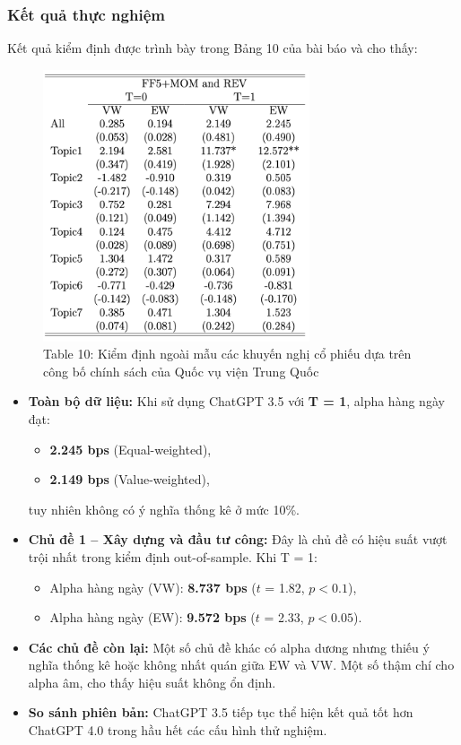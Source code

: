 \documentclass[a4paper,12pt]{article}
\begin{document}
\subsubsection{Kết quả thực nghiệm}

Kết quả kiểm định được trình bày trong Bảng 10 của bài báo và cho thấy:
\begin{figure}[H]
    \centering
    \includegraphics[width=0.7\textwidth]{table/tab10.png}
    \caption*{Table 10: Kiểm định ngoài mẫu các khuyến nghị cổ phiếu dựa trên công bố chính sách của Quốc vụ viện Trung Quốc}
    \label{fig:fig2}
\end{figure}
\begin{itemize}
    \item \textbf{Toàn bộ dữ liệu:} Khi sử dụng ChatGPT 3.5 với \textbf{T = 1}, alpha hàng ngày đạt:
    \begin{itemize}
        \item \textbf{2.245 bps} (Equal-weighted), 
        \item \textbf{2.149 bps} (Value-weighted),
    \end{itemize}
    tuy nhiên không có ý nghĩa thống kê ở mức 10\%.

    \item \textbf{Chủ đề 1 – Xây dựng và đầu tư công:}  
    Đây là chủ đề có hiệu suất vượt trội nhất trong kiểm định out-of-sample. Khi T = 1:
    \begin{itemize}
        \item Alpha hàng ngày (VW): \textbf{8.737 bps} ($t$ = 1.82, $p < 0.1$),
        \item Alpha hàng ngày (EW): \textbf{9.572 bps} ($t$ = 2.33, $p < 0.05$).
    \end{itemize}
    
    \item \textbf{Các chủ đề còn lại:}  
    Một số chủ đề khác có alpha dương nhưng thiếu ý nghĩa thống kê hoặc không nhất quán giữa EW và VW. Một số thậm chí cho alpha âm, cho thấy hiệu suất không ổn định.

    \item \textbf{So sánh phiên bản:} ChatGPT 3.5 tiếp tục thể hiện kết quả tốt hơn ChatGPT 4.0 trong hầu hết các cấu hình thử nghiệm.
\end{itemize}
\end{document}
